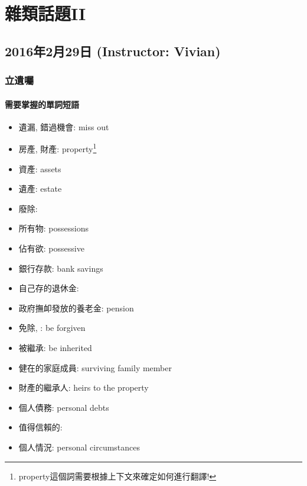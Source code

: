 \chapter{雜類話題II}
\section{2016年2月29日 (Instructor: Vivian)}
\subsection{立遺囑}
\subsubsection*{需要掌握的單詞短語}
\begin{multicols}{2}
\begin{itemize}
  \itemsep0em
  \item 遺漏, 錯過機會: miss out
  \item 房產, 財產: property\footnote{property這個詞需要根據上下文來確定如何進行翻譯!}
  \item 資產: assets
  \item 遺產: estate
  \item 廢除: 
  \item 所有物: possessions
  \item 佔有欲: possessive
  \item 銀行存款: bank savings
  \item 自己存的退休金: 
  \item 政府撫卹發放的養老金: pension
  \item 免除, : be forgiven
  \item 被繼承: be inherited
  \item 健在的家庭成員: surviving family member
  \item 財產的繼承人: heirs to the property
  \item 個人債務: personal debts
  \item 值得信賴的: 
  \item 個人情況: personal circumstances
\end{itemize}
\end{multicols}

